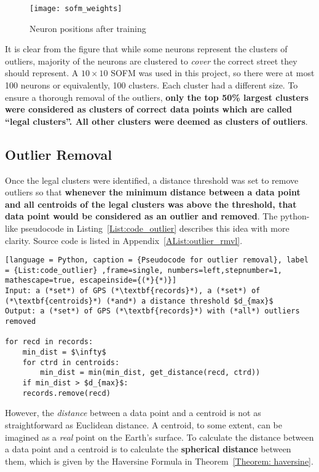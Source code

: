\begin{figure}[h]
\texttt{[image: sofm\_weights]}
\centering
\caption{Neuron positions after training}\label{Fig:sofm_weights}
\end{figure}

It is clear from the figure that while some neurons represent the clusters of outliers, majority of the neurons are clustered to \emph{cover} the correct street they should represent. A $10\times10$ SOFM was used in this project, so there were at most 100 neurons or equivalently, 100 clusters. Each cluster had a different size. To ensure a thorough removal of the outliers, \textbf{only the top 50\% largest clusters were considered as clusters of correct data points which are called ``legal clusters''. All other clusters were deemed as clusters of outliers}. 

\subsection{Outlier Removal}\label{Subsec:outlier_removal}
Once the legal clusters were identified, a distance threshold was set to remove outliers so that \textbf{whenever the minimum distance between a data point and all centroids of the legal clusters was above the threshold, that data point would be considered as an outlier and removed}. The python-like pseudocode in Listing~\ref{List:code_outlier} describes this idea with more clarity. Source code is listed in Appendix~\ref{AList:outlier_rmvl}.

\begin{lstlisting}[language = Python, caption = {Pseudocode for outlier removal}, label = {List:code_outlier} ,frame=single, numbers=left,stepnumber=1, mathescape=true, escapeinside={(*}{*)}]
Input: a (*set*) of GPS (*\textbf{records}*), a (*set*) of (*\textbf{centroids}*) (*and*) a distance threshold $d_{max}$
Output: a (*set*) of GPS (*\textbf{records}*) with (*all*) outliers removed

for recd in records:
    min_dist = $\infty$
    for ctrd in centroids:
        min_dist = min(min_dist, get_distance(recd, ctrd))
    if min_dist > $d_{max}$:
	records.remove(recd)
\end{lstlisting}

However, the \emph{distance} between a data point and a centroid is not as straightforward as Euclidean distance. A centroid, to some extent, can be imagined as a \emph{real} point on the Earth's surface. To calculate the distance between a data point and a centroid is to calculate the \textbf{spherical distance} between them, which is given by the Haversine Formula in Theorem~\ref{Theorem: haversine}. 


